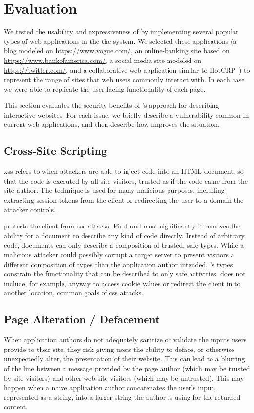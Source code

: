 \section{Evaluation}
\label{future-web:evaluation}

We tested the usability and expressiveness of \CDF by implementing several
popular types of web applications in the the system.  We selected these
applications (a blog modeled on \url{https://www.vogue.com/}, an online-banking
site based on \url{https://www.bankofamerica.com/}, a social media site modeled
on \url{https://twitter.com/}, and a collaborative web application similar to
HotCRP~\cite{hotCRPhomepage}) to represent the range of sites that web users
commonly interact with.  In each case we were able to replicate the user-facing
functionality of each page.

This section evaluates the security benefits of \CDF's approach for describing
interactive websites.  For each issue, we briefly
describe a vulnerability common in current web applications, and then
describe how \CDF improves the situation.


\subsection{Cross-Site Scripting}
\gls{xss} refers to when attackers are able to inject \JS code
into an HTML document, so that the code is executed by all site visitors, trusted
as if the code came from the site author.  The technique is used for many
malicious purposes, including extracting session tokens from the client or
redirecting the user to a domain the attacker controls.

\CDF protects the client from \gls{xss} attacks.  First and most significantly
it removes the ability for a document to describe any kind of \JS code
directly.  Instead of arbitrary code, \CDF documents can only describe a
composition of trusted, safe types.  While a malicious attacker could possibly
corrupt a target server to present visitors a different composition of types
than the application author intended, \CDF's types constrain the functionality
that can be described to only safe activities.  \CDF does not include, for
example, anyway to access cookie values or redirect the client in \JS to
another location, common goals of \gls{css} attacks.


\subsection{Page Alteration / Defacement}
When application authors do not adequately sanitize or validate the inputs
users provide to their site, they risk giving users the ability to deface, or
otherwise unexpectedly alter, the presentation of their website.  This
can lead to a blurring of the line between a message provided by the page
author (which may be trusted by site visitors) and other web site visitors
(which may be untrusted).  This may happen when a naive application
author concatenates the user's input, represented
as a string, into a larger string the author is using for the returned
content.

